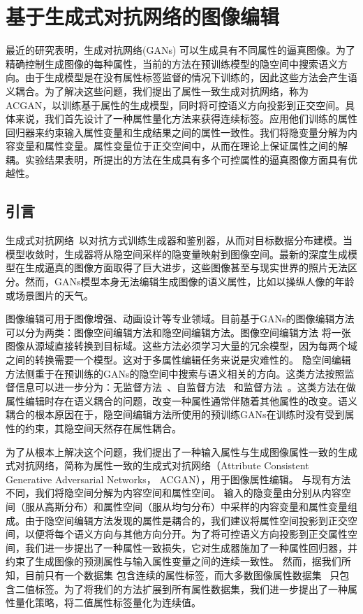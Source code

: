 \chapter{基于生成式对抗网络的图像编辑}

最近的研究表明，生成对抗网络(GANs) 可以生成具有不同属性的逼真图像。为了精确控制生成图像的每种属性，当前的方法在预训练模型的隐空间中搜索语义方向。由于生成模型是在没有属性标签监督的情况下训练的，因此这些方法会产生语义耦合。为了解决这些问题，我们提出了属性一致生成对抗网络，称为 ACGAN，以训练基于属性的生成模型，同时将可控语义方向投影到正交空间。具体来说，我们首先设计了一种属性量化方法来获得连续标签。应用他们训练的属性回归器来约束输入属性变量和生成结果之间的属性一致性。我们将隐变量分解为内容变量和属性变量。属性变量位于正交空间中，从而在理论上保证属性之间的解耦。实验结果表明，所提出的方法在生成具有多个可控属性的逼真图像方面具有优越性。

\section{引言}

生成式对抗网络~\cite{GANs}以对抗方式训练生成器和鉴别器，从而对目标数据分布建模。当模型收敛时，生成器将从隐空间采样的隐变量映射到图像空间。最新的深度生成模型在生成逼真的图像方面取得了巨大进步，这些图像甚至与现实世界的照片无法区分。然而，GANs模型本身无法编辑生成图像的语义属性，比如以操纵人像的年龄或场景图片的天气。

图像编辑可用于图像增强、动画设计等专业领域。目前基于GANs的图像编辑方法可以分为两类：图像空间编辑方法和隐空间编辑方法。图像空间编辑方法\cite{cyclegan,i2i0,i2i1,i2i2} 将一张图像从源域直接转换到目标域。这些方法必须学习大量的冗余模型，因为每两个域之间的转换需要一个模型。这对于多属性编辑任务来说是灾难性的。
隐空间编辑方法侧重于在预训练的GANs的隐空间中搜索与语义相关的方向。这类方法按照监督信息可以进一步分为：无监督方法~\cite{icml2020,harkonen2020ganspace}、自监督方法~\cite{steer,variation} 和监督方法~\cite{interfacegan,iclr2021}。这类方法在做属性编辑时存在语义耦合的问题，改变一种属性通常伴随着其他属性的改变。语义耦合的根本原因在于，隐空间编辑方法所使用的预训练GANs在训练时没有受到属性的约束，其隐空间天然存在属性耦合。

为了从根本上解决这个问题，我们提出了一种输入属性与生成图像属性一致的生成式对抗网络，简称为属性一致的生成式对抗网络（Attribute Consistent Generative Adversarial Networks， ACGAN），用于图像属性编辑。
与现有方法不同，我们将隐空间分解为内容空间和属性空间。
输入的隐变量由分别从内容空间（服从高斯分布）和属性空间（服从均匀分布）中采样的内容变量和属性变量组成。由于隐空间编辑方法发现的属性是耦合的，我们建议将属性空间投影到正交空间，以便将每个语义方向与其他方向分开。为了将可控语义方向投影到正交属性空间，我们进一步提出了一种属性一致损失，它对生成器施加了一种属性回归器，并约束了生成图像的预测属性与输入属性变量之间的连续一致性。
然而，据我们所知，目前只有一个数据集 \cite{scenedataset} 包含连续的属性标签，而大多数图像属性数据集~\cite{celeba,place,sun} 只包含二值标签。为了将我们的方法扩展到所有属性数据集，我们进一步提出了一种属性量化策略，将二值属性标签量化为连续值。

